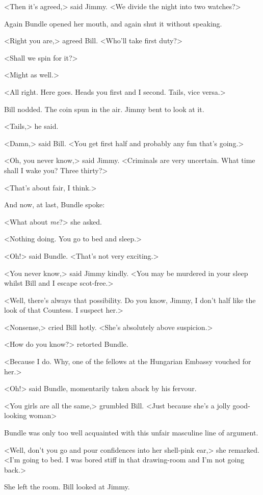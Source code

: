 <Then it's agreed,> said Jimmy. <We divide the night into two watches?>

Again Bundle opened her mouth, and again shut it without speaking.

<Right you are,> agreed Bill. <Who'll take first duty?>

<Shall we spin for it?>

<Might as well.>

<All right. Here goes. Heads you first and I second. Tails, vice versa.>

Bill nodded. The coin spun in the air. Jimmy bent to look at it.

<Tails,> he said.

<Damn,> said Bill. <You get first half and probably any fun that's going.>

<Oh, you never know,> said Jimmy. <Criminals are very uncertain. What time shall I wake you? Three thirty?>

<That's about fair, I think.>

And now, at last, Bundle spoke:

<What about \emph{me}?> she asked.

<Nothing doing. You go to bed and sleep.>

<Oh!> said Bundle. <That's not very exciting.>

<You never know,> said Jimmy kindly. <You may be murdered in your sleep whilst Bill and I escape scot-free.>

<Well, there's always that possibility. Do you know, Jimmy, I don't half like the look of that Countess. I suspect her.>

<Nonsense,> cried Bill hotly. <She's absolutely above suspicion.>

<How do you know?> retorted Bundle.

<Because I do. Why, one of the fellows at the Hungarian Embassy vouched for her.>

<Oh!> said Bundle, momentarily taken aback by his fervour.

<You girls are all the same,> grumbled Bill. <Just because she's a jolly good-looking woman\longdash>

Bundle was only too well acquainted with this unfair masculine line of argument.

<Well, don't you go and pour confidences into her shell-pink ear,> she remarked. <I'm going to bed. I was bored stiff in that drawing-room and I'm not going back.>

She left the room. Bill looked at Jimmy.

